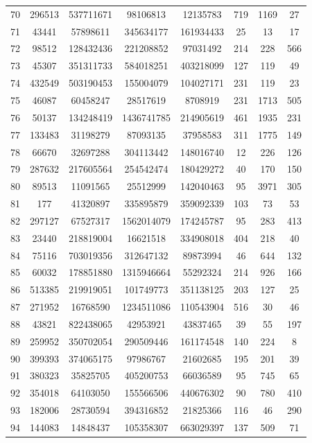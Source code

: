 \documentclass[11pt]{article}
\begin{document}
\begin{table}[h!]
\begin{tabular}{p{1cm}|C| C | C | C | C | C | C}
70 & 296513 & 537711671 & 98106813 & 12135783 & 719 & 1169 & 27 \\ 
71 & 43441 & 57898611 & 345634177 & 161934433 & 25 & 13 & 17 \\ 
72 & 98512 & 128432436 & 221208852 & 97031492 & 214 & 228 & 566 \\ 
73 & 45307 & 351311733 & 584018251 & 403218099 & 127 & 119 & 49 \\ 
74 & 432549 & 503190453 & 155004079 & 104027171 & 231 & 119 & 23 \\ 
75 & 46087 & 60458247 & 28517619 & 8708919 & 231 & 1713 & 505 \\ 
76 & 50137 & 134248419 & 1436741785 & 214905619 & 461 & 1935 & 231 \\ 
77 & 133483 & 31198279 & 87093135 & 37958583 & 311 & 1775 & 149 \\ 
78 & 66670 & 32697288 & 304113442 & 148016740 & 12 & 226 & 126 \\ 
79 & 287632 & 217605564 & 254542474 & 180429272 & 40 & 170 & 150 \\ 
80 & 89513 & 11091565 & 25512999 & 142040463 & 95 & 3971 & 305 \\ 
81 & 177 & 41320897 & 335895879 & 359092339 & 103 & 73 & 53 \\ 
82 & 297127 & 67527317 & 1562014079 & 174245787 & 95 & 283 & 413 \\ 
83 & 23440 & 218819004 & 16621518 & 334908018 & 404 & 218 & 40 \\ 
84 & 75116 & 703019356 & 312647132 & 89873994 & 46 & 644 & 132 \\ 
85 & 60032 & 178851880 & 1315946664 & 55292324 & 214 & 926 & 166 \\ 
86 & 513385 & 219919051 & 101749773 & 351138125 & 203 & 127 & 25 \\ 
87 & 271952 & 16768590 & 1234511086 & 110543904 & 516 & 30 & 46 \\ 
88 & 43821 & 822438065 & 42953921 & 43837465 & 39 & 55 & 197 \\ 
89 & 259952 & 350702054 & 290509446 & 161174548 & 140 & 224 & 8 \\ 
90 & 399393 & 374065175 & 97986767 & 21602685 & 195 & 201 & 39 \\ 
91 & 380323 & 35825705 & 405200753 & 66036589 & 95 & 745 & 65 \\ 
92 & 354018 & 64103050 & 155566506 & 440676302 & 90 & 780 & 410 \\ 
93 & 182006 & 28730594 & 394316852 & 21825366 & 116 & 46 & 290 \\ 
94 & 144083 & 14848437 & 105358307 & 663029397 & 137 & 509 & 71 \\ 

\end{tabular}
\end{table}
\end{document}
